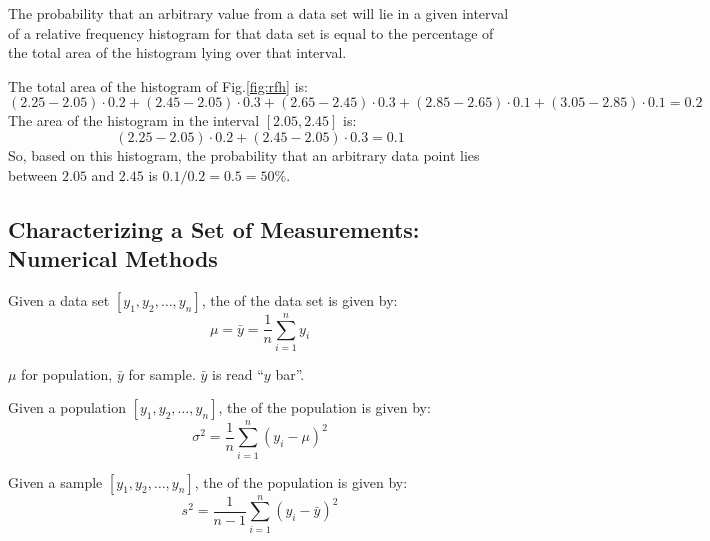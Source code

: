 \begin{note}
    The probability that an arbitrary value from a data set will lie in a given interval of a relative frequency histogram for that data set is equal to the percentage of the total area of the histogram lying over that interval.
\end{note}

\begin{exmp}
    The total area of the histogram of Fig.\ref{fig:rfh} is: $$(2.25 - 2.05)\cdot 0.2 + (2.45 - 2.05)\cdot 0.3 + (2.65 - 2.45)\cdot 0.3 + (2.85 - 2.65)\cdot 0.1 + (3.05 - 2.85)\cdot 0.1 = 0.2$$
    The area of the histogram in the interval $[2.05, 2.45]$ is: $$(2.25 - 2.05)\cdot 0.2 + (2.45 - 2.05)\cdot 0.3 = 0.1$$
    So, based on this histogram, the probability that an arbitrary data point lies between $2.05$ and $2.45$ is $0.1 / 0.2 = 0.5 = 50\%$.
\end{exmp}

\subsection{Characterizing a Set of Measurements: Numerical Methods}

\begin{defn}
    Given a data set $[y_{1}, y_{2}, \ldots, y_{n}]$, the  of the data set is given by: $$\mu = \bar{y} = \frac{1}{n} \sum_{i=1}^{n} y_{i}$$
\end{defn}

\begin{nota}
    $\mu$ for population, $\bar{y}$ for sample. $\bar{y}$ is read ``$y$ bar''.
\end{nota}

\begin{defn}
    Given a population $[y_{1}, y_{2}, \ldots, y_{n}]$, the  of the population is given by: $$\sigma^{2} = \frac{1}{n} \sum_{i=1}^{n} (y_{i} - \mu)^{2}$$
\end{defn}

\begin{nota}
\end{nota}

\begin{defn}
    Given a sample $[y_{1}, y_{2}, \ldots, y_{n}]$, the  of the population is given by: $$s^{2} = \frac{1}{n-1} \sum_{i=1}^{n} (y_{i} - \bar{y})^{2}$$
\end{defn}

